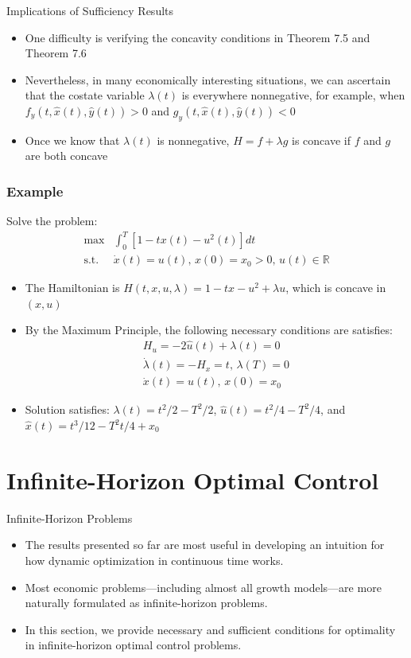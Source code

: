 \documentclass[9pt,aspectratio=169]{beamer}
\newcommand{\RR}{\mathbb{R}}
\begin{document}
\begin{frame}{Implications of Sufficiency Results}
\begin{itemize}
    \item One difficulty is verifying the concavity conditions in Theorem 7.5
    and Theorem 7.6
    \item Nevertheless, in many economically interesting situations, we can
    ascertain that the costate variable $\lambda(t)$ is everywhere
    nonnegative, for example, when $f_y(t, \hat{x}(t), \hat{y}(t)) > 0$
    and $g_y(t, \hat{x}(t), \hat{y}(t)) < 0$
    \item Once we know that $\lambda(t)$ is nonnegative, $H = f + \lambda g$
    is concave if $f$ and $g$ are both concave
\end{itemize}
\end{frame}

\begin{frame}
    \frametitle{Example}
    Solve the problem:
    \begin{align*}
        \max &\int_0^T \left[1 - tx(t) - u^2(t)\right]dt\\
        \text{s.t. } & \dot x(t) = u(t),\, x(0) = x_0 > 0,\, u(t) \in \RR
    \end{align*}
    \begin{itemize}
        \item The Hamiltonian is $H(t, x, u, \lambda) = 1 - tx - u^2 +
        \lambda u$, which is concave in $(x, u)$
        \item By the Maximum Principle, the following necessary conditions
        are satisfies:
        \begin{align*}
            H_u = -2\hat u(t) + \lambda(t) = 0\\
            \dot \lambda(t) = - H_x = t,\, \lambda(T) = 0\\
            \dot x(t) = u(t),\, x(0) = x_0
        \end{align*}
        \item Solution satisfies: $\lambda(t) = t^2/2 - T^2/2$, $\hat u(t) =
        t^2/4 - T^2/4$, and $\hat x(t) = t^3/12 - T^2t/4 + x_0$
    \end{itemize}
\end{frame}

\section{Infinite-Horizon Optimal Control}

\begin{frame}{Infinite-Horizon Problems}
\begin{itemize}
    \item The results presented so far are most useful in developing an
    intuition for how dynamic optimization in continuous time works.
    \item Most economic problems---including almost all growth models---are
    more naturally formulated as infinite-horizon problems.
    \item In this section, we provide necessary and sufficient conditions for
    optimality in infinite-horizon optimal control problems.
\end{itemize}
\end{frame}
\end{document}
